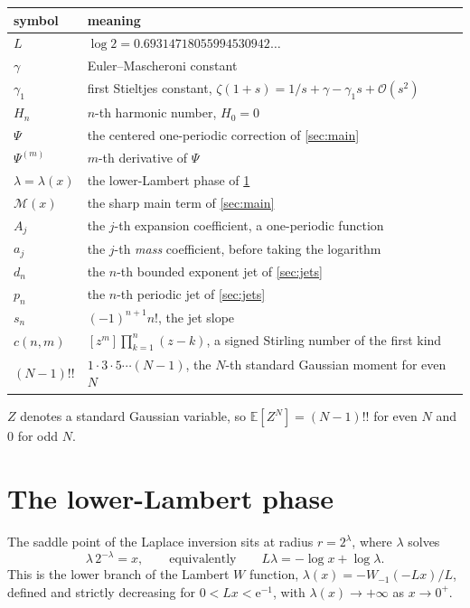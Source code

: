 \documentclass[11pt,oneside]{article}
\theoremstyle{definition}
\theoremstyle{remark}
\newcommand{\e}{\mathrm e}
\newcommand{\E}{\mathbb E}
\newcommand{\bigO}{\mathcal O}
\begin{document}
\begin{center}
\begin{tabular}{@{}ll@{}}
\toprule
symbol & meaning\\
\midrule
$L$ & $\log2=0.69314718055994530942\dots$\\
$\gamma$ & Euler--Mascheroni constant\\
$\gamma_1$ & first Stieltjes constant, $\zeta(1+s)=1/s+\gamma-\gamma_1s+\bigO(s^2)$\\
$H_n$ & $n$-th harmonic number, $H_0=0$\\
$\Psi$ & the centered one-periodic correction of \cref{sec:main}\\
$\Psi^{(m)}$ & $m$-th derivative of $\Psi$\\
$\lambda=\lambda(x)$ & the lower-Lambert phase of \cref{sec:lambert}\\
$\mathcal M(x)$ & the sharp main term of \cref{sec:main}\\
$A_j$ & the $j$-th expansion coefficient, a one-periodic function\\
$a_j$ & the $j$-th \emph{mass} coefficient, before taking the logarithm\\
$d_n$ & the $n$-th bounded exponent jet of \cref{sec:jets}\\
$p_n$ & the $n$-th periodic jet of \cref{sec:jets}\\
$s_n$ & $(-1)^{n+1}n!$, the jet slope\\
$c(n,m)$ & $[z^m]\prod_{k=1}^n(z-k)$, a signed Stirling number of the first kind\\
$(N-1)!!$ & $1\cdot3\cdot5\cdots(N-1)$, the $N$-th standard Gaussian moment for even $N$\\
\bottomrule
\end{tabular}
\end{center}

$Z$ denotes a standard Gaussian variable, so $\E[Z^N]=(N-1)!!$ for even $N$ and
$0$ for odd $N$.

\section{The lower-Lambert phase}\label{sec:lambert}

The saddle point of the Laplace inversion sits at radius $r=2^\lambda$, where
$\lambda$ solves
\begin{equation}\label{eq:lambda}
  \lambda\,2^{-\lambda}=x,
  \qquad\text{equivalently}\qquad
  L\lambda=-\log x+\log\lambda .
\end{equation}
This is the lower branch of the Lambert $W$ function,
$\lambda(x)=-W_{-1}(-Lx)/L$, defined and strictly decreasing for
$0<Lx<\e^{-1}$, with $\lambda(x)\to+\infty$ as $x\to0^+$.
\end{document}
